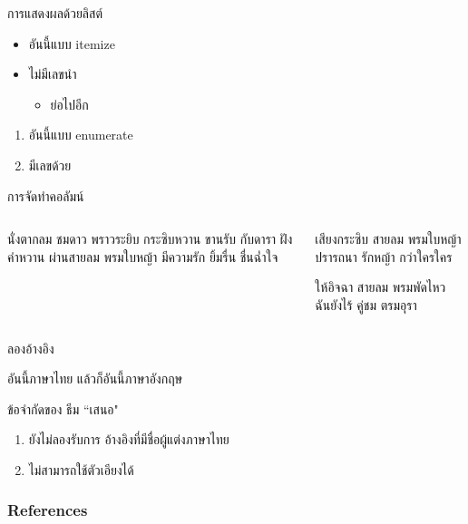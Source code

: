\documentclass[xetex,serif]{beamer}
\begin{document}
\begin{frame}{การแสดงผลด้วยลิสต์}
\begin{itemize}
	\item อันนี้แบบ itemize
	\item ไม่มีเลขนำ \begin{itemize}
	\item ย่อไปอีก
	\end{itemize}
\end{itemize}
	
\begin{enumerate}
	\item อันนี้แบบ enumerate
	\item มีเลขด้วย
\end{enumerate}
\end{frame}


\begin{frame}{การจัดทำคอลัมน์}

\begin{columns}
\begin{column}{0.5\textwidth}
นั่งตากลม ชมดาว พราวระยิบ
กระซิบหวาน ขานรับ กับดารา
\bigskip
ฝังคำหวาน ผ่านสายลม พรมใบหญ้า
มีความรัก ยิ้มรื่น ชื่นฉ่ำใจ



\end{column}
\begin{column}{0.5\textwidth}
เสียงกระซิบ สายลม พรมใบหญ้า
ปรารถนา รักหญ้า กว่าใครใคร

\bigskip

ให้อิจฉา สายลม พรมพัดไหว
ฉันยังไร้ คู่ชม ตรมอุรา


\end{column}
\end{columns}

	
\end{frame}

\begin{frame}{ลองอ้างอิง}

อันนี้ภาษาไทย \cite{phongpaichit1996} แล้วก็อันนี้ภาษาอังกฤษ \cite{4600388}
\end{frame}

\begin{frame}{ข้อจำกัดของ ธีม ``เสนอ"}
\begin{enumerate}
	\item ยังไม่ลองรับการ อ้างอิงที่มีชื่อผู้แต่งภาษาไทย
	\item ไม่สามารถใช้ตัวเอียงได้
\end{enumerate}

\end{frame}

\begin{frame}[allowframebreaks]
        \frametitle{References}
        
        
\end{frame}
\end{document}
